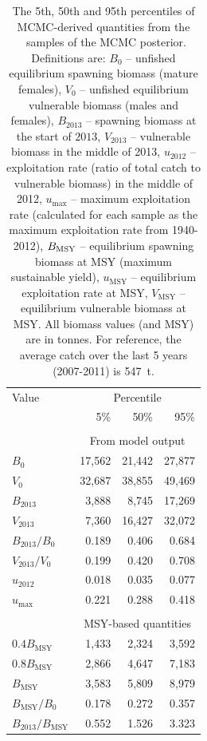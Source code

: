 \begin{table}[tp]
\centering
\caption{\label{tab:MCMCderived} The 5th, 50th and 95th percentiles of MCMC-derived quantities from the \numMCMC~samples of the MCMC posterior. Definitions are: $B_0$ -- unfished equilibrium spawning biomass (mature females), $V_0$ -- unfished equilibrium vulnerable biomass (males and females), $B_{2013}$ -- spawning biomass at the start of $2013$, $V_{2013}$ -- vulnerable biomass in the middle of 2013, $u_{2012}$ -- exploitation rate (ratio of total catch to vulnerable biomass) in the middle of 2012, $u_\mathrm{max}$ -- maximum exploitation rate (calculated for each sample as the maximum exploitation rate from 1940-2012), $B_\mathrm{MSY}$ -- equilibrium spawning biomass at MSY (maximum sustainable yield), $u_\mathrm{MSY}$ -- equilibrium exploitation rate at MSY, $V_\mathrm{MSY}$ -- equilibrium vulnerable biomass at MSY. All biomass values (and MSY) are in tonnes. For reference, the average catch over the last 5 years (2007-2011) is 547~t.}
\begin{tabular}{lrrr} 
\hline
Value & \multicolumn{3}{c}{Percentile}\\
\cline{2-4}
 & 5\% & 50\% & 95\% \\
\hline 
 & & & \\
& \multicolumn{3}{c}{From model output}\\
$B_0$                  & 17,562 & 21,442 & 27,877 \\
$V_0$                  & 32,687 & 38,855 & 49,469 \\
$B_{2013}$             & 3,888 & 8,745 & 17,269 \\
$V_{2013}$             & 7,360 & 16,427 & 32,072 \\

$B_{2013} / B_0$       & 0.189 & 0.406 & 0.684 \\
$V_{2013} / V_0$     & 0.199 & 0.420 & 0.708 \\

$u_{2012}$             & 0.018 & 0.035 & 0.077 \\
$u_\mathrm{max}$       & 0.221 & 0.288 & 0.418 \\
\hline
 & & & \\
& \multicolumn{3}{c}{MSY-based quantities}\\
$0.4 B_\mathrm{MSY}$   &  1,433 & 2,324 & 3,592 \\
$0.8 B_\mathrm{MSY}$   &  2,866 & 4,647 & 7,183 \\
$B_\mathrm{MSY}$       &  3,583 & 5,809 & 8,979 \\
$B_\mathrm{MSY} / B_0$ &  0.178 & 0.272 & 0.357 \\
$B_{2013} / B_\mathrm{MSY}$ & 0.552 & 1.526 & 3.323 \\


\end{tabular}
\end{table}
